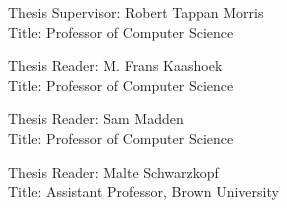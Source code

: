 \documentclass[fontsize=12pt,paper=letter]{scrartcl}
\begin{document}
\begin{titlepage}
\begin{flushleft}
  \vspace{\baselineskip}
  Thesis Supervisor: Robert Tappan Morris\\
  Title: Professor of Computer Science

  \vspace{0.5\baselineskip}
  Thesis Reader: M. Frans Kaashoek\\
  Title: Professor of Computer Science

  \vspace{0.5\baselineskip}
  Thesis Reader: Sam Madden\\
  Title: Professor of Computer Science

  \vspace{0.5\baselineskip}
  Thesis Reader: Malte Schwarzkopf\\
  Title: Assistant Professor, Brown University
  \end{flushleft}
\end{titlepage}
\end{document}

